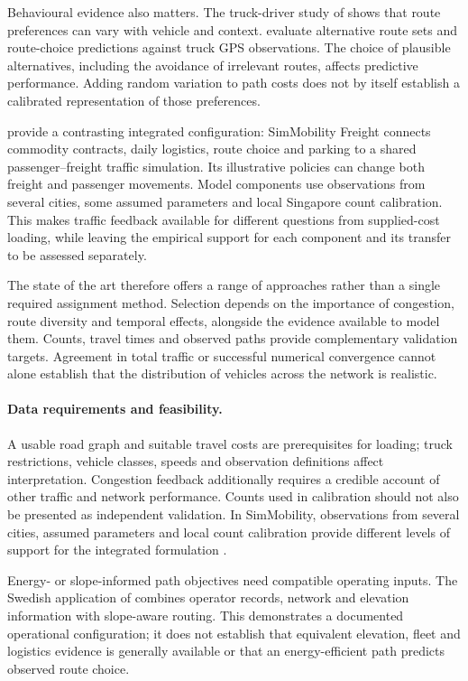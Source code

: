 Behavioural evidence also matters. The truck-driver study of \textcite{feng2013}
shows that route preferences can vary with vehicle and context.
\Textcite{tahlyan2017} evaluate alternative route sets and route-choice
predictions against truck GPS observations. The choice of plausible alternatives,
including the avoidance of irrelevant routes, affects predictive performance.
Adding random variation to path costs does not by itself establish a calibrated
representation of those preferences.

\Textcite{sakai2020} provide a contrasting integrated configuration:
SimMobility Freight connects commodity contracts, daily logistics, route choice
and parking to a shared passenger--freight traffic simulation. Its illustrative
policies can change both freight and passenger movements. Model components use
observations from several cities, some assumed parameters and local Singapore
count calibration. This makes traffic feedback available for different questions
from supplied-cost loading, while leaving the empirical support for each
component and its transfer to be assessed separately.

The state of the art therefore offers a range of approaches rather than a single
required assignment method. Selection depends on the importance of congestion,
route diversity and temporal effects, alongside the evidence available to model
them. Counts, travel times and observed paths provide complementary validation
targets. Agreement in total traffic or successful numerical convergence cannot
alone establish that the distribution of vehicles across the network is
realistic.

\paragraph{Data requirements and feasibility.}
A usable road graph and suitable travel costs are prerequisites for loading;
truck restrictions, vehicle classes, speeds and observation definitions affect
interpretation. Congestion feedback additionally requires a credible account
of other traffic and network performance. Counts used in calibration should
not also be presented as independent validation. In SimMobility, observations
from several cities, assumed parameters and local count calibration provide
different levels of support for the integrated formulation
\parencite{sakai2020}.

Energy- or slope-informed path objectives need compatible operating inputs.
The Swedish application of \textcite{dias2026} combines operator records,
network and elevation information with slope-aware routing. This demonstrates
a documented operational configuration; it does not establish that equivalent
elevation, fleet and logistics evidence is generally available or that an
energy-efficient path predicts observed route choice.


